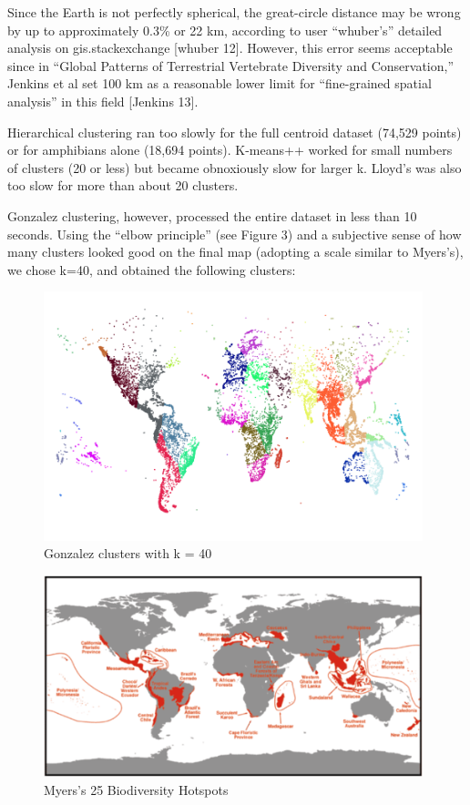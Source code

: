 \documentclass[11pt, fullpage,letterpaper]{article}
\renewcommand{\cite}[1]{[#1]}
\begin{document}
		Since the Earth is not perfectly spherical, the great-circle distance may be wrong by up to approximately 0.3\% or 22 km, according to user ``whuber's'' detailed analysis on gis.stackexchange \cite{whuber 12}. However, this error seems acceptable since in ``Global Patterns of Terrestrial Vertebrate Diversity and Conservation,'' Jenkins et al set 100 km as a reasonable lower limit for ``fine-grained spatial analysis'' in this field \cite{Jenkins 13}.
	
		Hierarchical clustering ran too slowly for the full centroid dataset (74,529 points) or for amphibians alone (18,694 points). K-means++ worked for small numbers of clusters (20 or less) but became obnoxiously slow for larger k. Lloyd's was also too slow for more than about 20 clusters. 
		
		Gonzalez clustering, however, processed the entire dataset in less than 10 seconds. Using the “elbow principle” (see Figure 3) and a subjective sense of how many clusters looked good on the final map (adopting a scale similar to Myers's), we chose k=40, and obtained the following clusters:

		\begin{figure}[H]
			\centering
			\includegraphics[width=11cm]{gonzalez.png}
			\caption{Gonzalez clusters with k = 40}
		\end{figure}
		
		\begin{figure}[H]
			\centering
			\includegraphics[width=11cm]{myers.png}
			\caption{Myers's 25 Biodiversity Hotspots}
		\end{figure}
		
\end{document}
